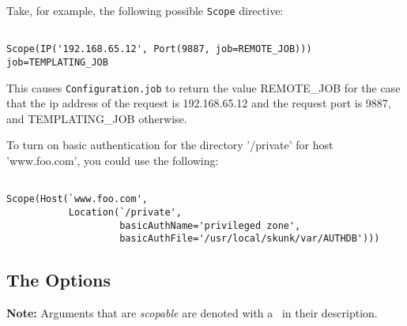\documentclass[titlepage]{manual}
\begin{document}
Take, for example, the following possible \texttt{Scope} directive:

\begin{verbatim}

Scope(IP('192.168.65.12', Port(9887, job=REMOTE_JOB)))
job=TEMPLATING_JOB

\end{verbatim}
This causes \texttt{Configuration.job} to return the value REMOTE_JOB for the case that the ip address of the 
request is 192.168.65.12 and the request port is 9887, and TEMPLATING_JOB otherwise.
 
To turn on basic authentication for the directory '/private' for host 'www.foo.com', you could
use the following:
\begin{verbatim}

Scope(Host(`www.foo.com', 
           Location(`/private',
                    basicAuthName='privileged zone',
                    basicAuthFile='/usr/local/skunk/var/AUTHDB')))

\end{verbatim}	

\subsection{The Options}
\textbf{Note:} Arguments that are \emph{scopable} are denoted with a 
\nonscope\ in their description.
\end{document}
